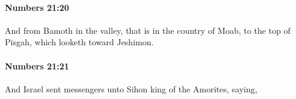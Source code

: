 		\paragraph{Numbers 21:20} %
			\label{NUMBERS-21-20}

			And from Bamoth in the valley, that is in the country of Moab, to the top of Pisgah, which looketh toward Jeshimon.


		\paragraph{Numbers 21:21} %
			\label{NUMBERS-21-21}

			And Israel sent messengers unto Sihon king of the Amorites, saying,


